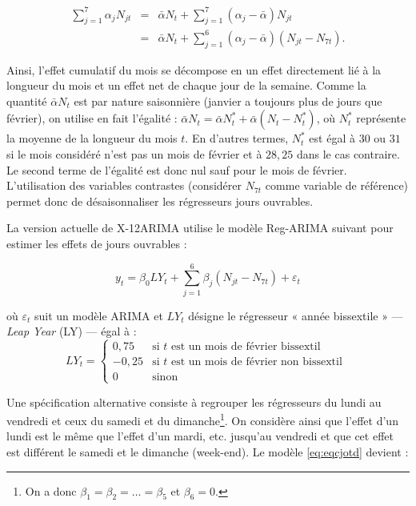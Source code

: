 \documentclass[11pt,french,french]{article}
\let\rmarkdownfootnote\footnote%
\def\footnote{\protect\rmarkdownfootnote}
\begin{document}
\begin{eqnarray*}
\sum_{j=1}^7 \alpha_j N_{jt} & = & \bar{\alpha}N_t + \sum_{j=1}^7 \left(\alpha_j-\bar{\alpha}\right) N_{jt} \nonumber \\
& = &  \bar{\alpha}N_t + \sum_{j=1}^6 \left(\alpha_j-\bar{\alpha}\right) \left(N_{jt} - N_{7t}\right).
\end{eqnarray*}

Ainsi, l'effet cumulatif du mois se décompose en un effet directement
lié à la longueur du mois et un effet net de chaque jour de la semaine.
Comme la quantité \(\bar{\alpha}N_t\) est par nature saisonnière
(janvier a toujours plus de jours que février), on utilise en fait
l'égalité :
\(\bar{\alpha}N_t = \bar{\alpha}N_t^* + \bar{\alpha}\left(N_t-N_t^*\right)\),
où \(N_t^*\) représente la moyenne de la longueur du mois \(t\). En
d'autres termes, \(N_t^*\) est égal à \(30\) ou \(31\) si le mois
considéré n'est pas un mois de février et à \(28,25\) dans le cas
contraire. Le second terme de l'égalité est donc nul sauf pour le mois
de février. L'utilisation des variables contrastes (considérer
\(N_{7t}\) comme variable de référence) permet donc de désaisonnaliser
les régresseurs jours ouvrables.

La version actuelle de X-12ARIMA utilise le modèle Reg-ARIMA suivant
pour estimer les effets de jours ouvrables :

\begin{equation}
y_t=\beta_0 LY_t + \sum_{j=1}^{6} \beta_j \left(N_{jt} - N_{7t}\right) + \varepsilon_t
    \label{eq:eqcjotd}
\end{equation}

où \(\varepsilon_t\) suit un modèle ARIMA et \(LY_t\) désigne le
régresseur « année bissextile » --- \emph{Leap Year} (LY) --- égal à :
\[
LY_{t} = \left\{ \begin{array}{rl} 
                0,75 & \mbox{si } t \mbox{ est un mois de février bissextil } \\
                -0,25 & \mbox{si } t \mbox{ est un mois de février non bissextil } \\
                0 & \mbox{sinon}
               \end{array}
         \right.
\]

Une spécification alternative consiste à regrouper les régresseurs du
lundi au vendredi et ceux du samedi et du dimanche\footnote{On a donc
  \(\beta_1=\beta_2=\dots=\beta_5\) et \(\beta_6 = 0\).}. On considère
ainsi que l'effet d'un lundi est le même que l'effet d'un mardi, etc.
jusqu'au vendredi et que cet effet est différent le samedi et le
dimanche (week-end). Le modèle \eqref{eq:eqcjotd} devient :
\end{document}
